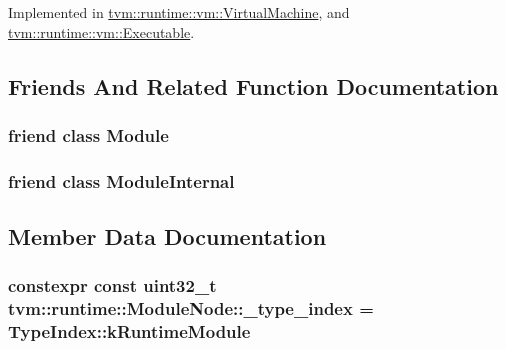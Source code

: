 Implemented in \hyperlink{classtvm_1_1runtime_1_1vm_1_1VirtualMachine_a00f035566a720dbac56f5dea042fb0ec}{tvm\+::runtime\+::vm\+::\+Virtual\+Machine}, and \hyperlink{classtvm_1_1runtime_1_1vm_1_1Executable_aef4f3663ee57fcbdf2d775f4dbbe79dc}{tvm\+::runtime\+::vm\+::\+Executable}.



\subsection{Friends And Related Function Documentation}
\subsubsection[{\texorpdfstring{Module}{Module}}]{\setlength{\rightskip}{0pt plus 5cm}friend class {\bf Module}\hspace{0.3cm}{\ttfamily [friend]}}\hypertarget{classtvm_1_1runtime_1_1ModuleNode_a21f639900c480510650969df9c74d17d}{}\label{classtvm_1_1runtime_1_1ModuleNode_a21f639900c480510650969df9c74d17d}
\subsubsection[{\texorpdfstring{Module\+Internal}{ModuleInternal}}]{\setlength{\rightskip}{0pt plus 5cm}friend class Module\+Internal\hspace{0.3cm}{\ttfamily [friend]}}\hypertarget{classtvm_1_1runtime_1_1ModuleNode_a2b490c1acecd166b5824e4e96f17c64e}{}\label{classtvm_1_1runtime_1_1ModuleNode_a2b490c1acecd166b5824e4e96f17c64e}


\subsection{Member Data Documentation}
\subsubsection[{\texorpdfstring{\+\_\+type\+\_\+index}{_type_index}}]{\setlength{\rightskip}{0pt plus 5cm}constexpr const uint32\+\_\+t tvm\+::runtime\+::\+Module\+Node\+::\+\_\+type\+\_\+index = Type\+Index\+::k\+Runtime\+Module\hspace{0.3cm}{\ttfamily [static]}}\hypertarget{classtvm_1_1runtime_1_1ModuleNode_a56e23ef9427bd055c4868135cc1f38bd}{}\label{classtvm_1_1runtime_1_1ModuleNode_a56e23ef9427bd055c4868135cc1f38bd}
